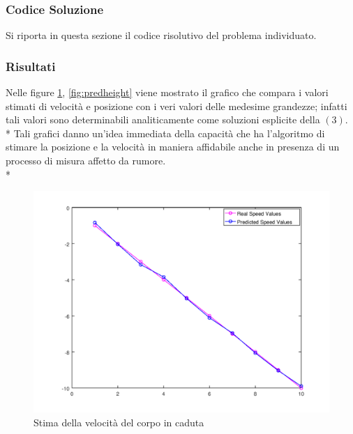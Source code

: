 \subsubsection{Codice Soluzione}
Si riporta in questa sezione il codice risolutivo del problema individuato.



\newpage

\newpage
\subsubsection{Risultati}
Nelle figure \ref{fig:predspeed}, \ref{fig:predheight} viene mostrato il grafico che compara i valori stimati di velocit\`a e posizione con i veri valori delle medesime grandezze; infatti tali valori sono determinabili analiticamente come soluzioni esplicite della $(3)$.\\*
Tali grafici danno un'idea immediata della capacit\`a che ha l'algoritmo di stimare la posizione e la velocit\`a in maniera affidabile anche in presenza di un processo di misura affetto da rumore.\\*
\begin{figure}[h]
	\centering
	\includegraphics[scale=0.7]{img/predspeed}
	\caption{Stima della velocit\`a del corpo in caduta}
	\label{fig:predspeed}
\end{figure}

